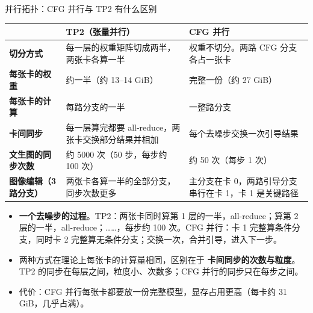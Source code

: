 \begin{frame}[t]{并行拓扑：CFG 并行与 TP2 有什么区别}
\scriptsize\def\codesize{\relax}
\renewcommand{\arraystretch}{1.15}\setlength{\tabcolsep}{3pt}
\begin{tabularx}{\textwidth}{>{\bfseries}p{2.4cm} Y Y}
\toprule
{}
 & TP2（张量并行） & CFG 并行 \\
\midrule
切分方式 & 每一层的权重矩阵切成两半，两张卡各算一半 & 权重不切分。两路 CFG 分支各占一张卡 \\
每张卡的权重 & 约一半（约 13--14 GiB） & 完整一份（约 27 GiB） \\
每张卡的计算 & 每路分支的一半 & 一整路分支 \\
卡间同步 & 每一层算完都要 all-reduce，两张卡交换部分结果并相加 & 每个去噪步交换一次引导结果 \\
文生图的同步次数 & 约 5000 次（50 步，每步约 100 次） & 约 50 次（每步 1 次） \\
图像编辑（3 路分支） & 两张卡各算一半的全部分支，同步次数更多 & 主分支在卡 0，两路引导分支串行在卡 1，卡 1 是关键路径 \\
\bottomrule
\end{tabularx}
\vspace{4pt}
\begin{itemize}\scriptsize\setlength\itemsep{2pt}
  \item \textbf{一个去噪步的过程}。TP2：两张卡同时算第 1 层的一半，all-reduce；算第 2 层的一半，all-reduce；……，每步约 100 次。CFG 并行：卡 1 完整算条件分支，同时卡 2 完整算无条件分支；交换一次，合并引导，进入下一步。
  \item 两种方式在理论上每张卡的计算量相同，区别在于 \textbf{卡间同步的次数与粒度}。TP2 的同步在每层之间，粒度小、次数多；CFG 并行的同步只在每步之间。
  \item 代价：CFG 并行每张卡都要放一份完整模型，显存占用更高（每卡约 31 GiB，几乎占满）。
\end{itemize}
\end{frame}

